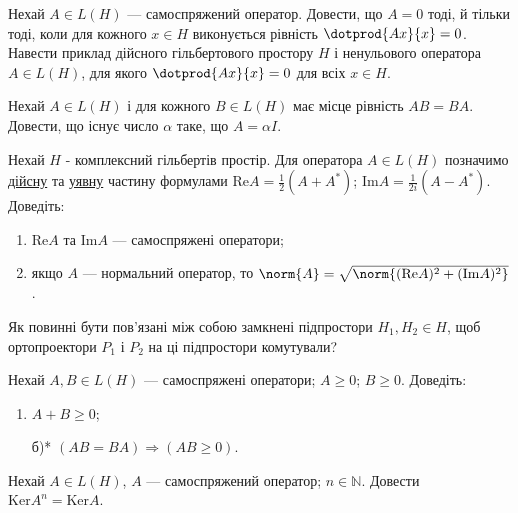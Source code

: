 
\begin{exercise}
    Нехай $A \in L(H)$ --- самоспряжений оператор. Довести, що $A = 0$ тоді,
    й тільки тоді, коли для кожного $x \in H$ виконується рівність $\dotprod{Ax}{x}=0$.
    Навести приклад дійсного гільбертового простору $H$ і ненульового оператора
    $A \in L(H)$, для якого $\dotprod{Ax}{x}=0$ для всіх $x \in H$.
\end{exercise}

\begin{exercise}
    Нехай $A \in L(H)$ і для кожного $B \in L(H)$ має місце рівність $AB = BA$.
    Довести, що існує число $\alpha$ таке, що $A = \alpha I$.
\end{exercise}

\begin{exercise}
    Нехай $H$ - комплексний гільбертів простір. Для оператора $A \in L(H)$ позначимо
    \uline{дійсну} та \uline{уявну} частину формулами $\mathrm{Re}A = \frac{1}{2} (A + A^*)$;
    $\mathrm{Im}A = \frac{1}{2i} (A - A^*)$. Доведіть:
    \begin{enumerate}[label=\ukr*)]
        \item $\mathrm{Re}A$ та $\mathrm{Im}A$ --- самоспряжені оператори;
        \item якщо $A$ --- нормальний оператор, то $\norm{A} = 
        \sqrt{\norm{ (\mathrm{Re}A)^2 + (\mathrm{Im}A)^2 }}$.
    \end{enumerate}
\end{exercise}

\begin{exercise}
    Як повинні бути пов'язані між собою замкнені підпростори $H_1, H_2 \in H$,
    щоб ортопроектори $P_1$ і $P_2$ на ці підпростори комутували?
\end{exercise}

\begin{exercise}
    Нехай $A, B \in L(H)$ --- самоспряжені оператори; $A \geq 0$; $B \geq 0$.
    Доведіть:
    \begin{enumerate}[label=\ukr*)]
        \item $A + B \geq 0$;
        \item[б)*] $(AB = BA) \Rightarrow (AB \geq 0)$. %
    \end{enumerate}
\end{exercise}

\begin{exercise}
    Нехай $A \in L(H)$, $A$ --- самоспряжений оператор; $n \in \mathbb{N}$.
    Довести $\mathrm{Ker}A^n = \mathrm{Ker}A$. 
\end{exercise}

